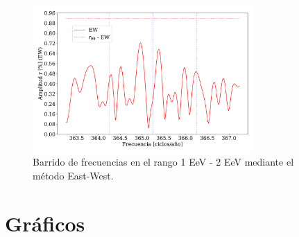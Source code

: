     \begin{figure}[H]
        \begin{small}
            \begin{center}
                \includegraphics[width=0.75\textwidth]{plot_bin_3_barrido_v3_EW.pdf}
            \end{center}
            \caption{Barrido de frecuencias en el rango 1 EeV - 2 EeV mediante el método East-West.}
            \label{fig:tercer_barrido}
        \end{small}
    \end{figure}    

    \section{Gráficos}



    

